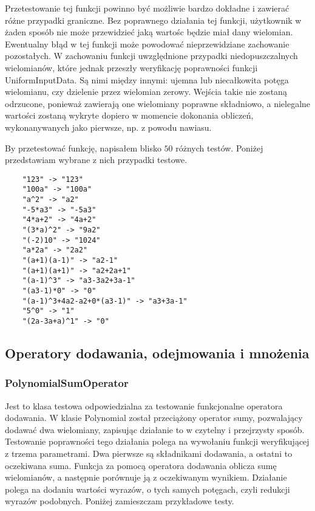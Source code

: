 \documentclass[oneside,a4paper]{book}
\begin{document}
	Przetestowanie tej funkcji powinno być możliwie bardzo dokładne i zawierać różne przypadki graniczne. Bez poprawnego działania tej funkcji, użytkownik w żaden sposób nie może przewidzieć jaką wartośc będzie miał dany wielomian. Ewentualny błąd w tej funkcji może powodować nieprzewidziane zachowanie pozostałych. W zachowaniu funkcji uwzględnione przypadki niedopuszczalnych wielomianów, które jednak przeszły weryfikację poprawności funkcji UniformInputData. Są nimi między innymi: ujemna lub niecałkowita potęga wielomianu, czy dzielenie przez wielomian zerowy. Wejścia takie nie zostaną odrzucone, ponieważ zawierają one wielomiany poprawne składniowo, a nielegalne wartości zostaną wykryte dopiero w momencie dokonania obliczeń, wykonanywanych jako pierwsze, np. z powodu nawiasu.
	
	By przetestować funkcję, napisałem blisko $50$ różnych testów. Poniżej przedstawiam wybrane z nich przypadki testowe.
	
	\begin{lstlisting}
	"123" -> "123"
	"100a" -> "100a"
	"a^2" -> "a2"
	"-5*a3" -> "-5a3"
	"4*a+2" -> "4a+2"
	"(3*a)^2" -> "9a2"
	"(-2)10" -> "1024"
	"a*2a" -> "2a2"
	"(a+1)(a-1)" -> "a2-1"
	"(a+1)(a+1)" -> "a2+2a+1"
	"(a-1)^3" -> "a3-3a2+3a-1"
	"(a3-1)*0" -> "0"
	"(a-1)^3+4a2-a2+0*(a3-1)" -> "a3+3a-1"
	"5^0" -> "1"
	"(2a-3a+a)^1" -> "0"
	\end{lstlisting}
	
	\subsection{Operatory dodawania, odejmowania i mnożenia}
	
	\subsubsection{PolynomialSumOperator}
	
	Jest to klasa testowa odpowiedzialna za testowanie funkcjonalne operatora dodawania. W klasie Polynomial został przeciążony operator sumy, pozwalający dodawać dwa wielomiany, zapisując działanie to w czytelny i przejrzysty sposób. Testowanie poprawności tego działania polega na wywołaniu funkcji weryfikującej z trzema parametrami. Dwa pierwsze są składnikami dodawania, a ostatni to oczekiwana suma. Funkcja za pomocą operatora dodawania oblicza sumę wielomianów, a następnie porównuje ją z oczekiwanym wynikiem. Działanie polega na dodaniu wartości wyrazów, o tych samych potęgach, czyli redukcji wyrazów podobnych. Poniżej zamieszczam przykładowe testy.
	
\end{document}
